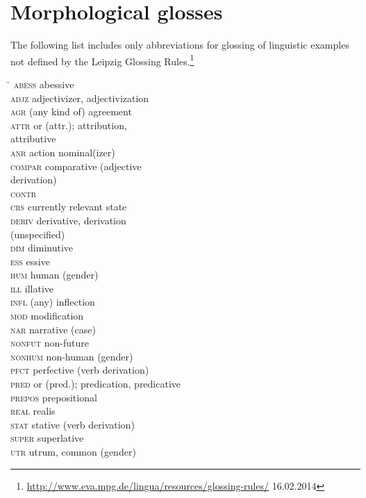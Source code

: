 

\section*{Morphological glosses}
The following list includes only abbreviations for glossing of linguistic examples not defined by the Leipzig Glossing Rules.\footnote{\url{http://www.eva.mpg.de/lingua/resources/glossing-rules/} 16.02.2014}
\begin{multicols}{2}
\begin{tabbing}
\TABh \= \kill
\textsc{abess} \> abessive\\
\textsc{adjz} \> adjectivizer, adjectivization\\
\textsc{agr} \> (any kind of) agreement\\
\textsc{attr} \> or (attr.); attribution,\\ \> attributive\\
\textsc{anr} \> action nominal(izer)\\
\textsc{compar} \> comparative (adjective\\ \> derivation)\\
\textsc{contr} \> \\
\textsc{crs} \> currently relevant state\\
\textsc{deriv} \> derivative, derivation\\ \> (unspecified)\\
\textsc{dim} \> diminutive\\
\textsc{ess} \> essive\\
\textsc{hum} \> human (gender)\\
\textsc{ill} \> illative\\
\textsc{infl} \> (any) inflection\\
\textsc{mod} \> modification\\
\textsc{nar} \> narrative (case)\\
\textsc{nonfut} \> non-future\\
\textsc{nonhum} \> non-human (gender)\\
\textsc{pfct} \> perfective (verb derivation)\\
\textsc{pred} \> or (pred.); predication, predicative\\
\textsc{prepos} \> prepositional\\
\textsc{real} \> realis\\
\textsc{stat} \> stative (verb derivation)\\
\textsc{super} \> superlative\\
\textsc{utr} \> utrum, common (gender)
\end{tabbing}
\end{multicols}

